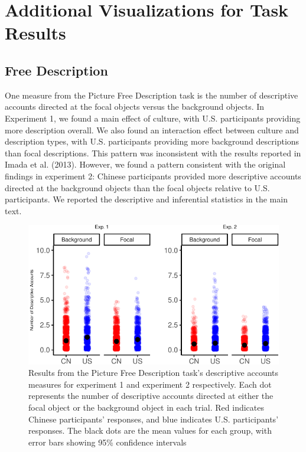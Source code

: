 \documentclass[
  man,floatsintext]{apa6}
\begin{document}
\hypertarget{additional-visualizations-for-task-results}{%
\section{Additional Visualizations for Task Results}\label{additional-visualizations-for-task-results}}

\hypertarget{free-description}{%
\subsection{Free Description}\label{free-description}}

One measure from the Picture Free Description task is the number of descriptive accounts directed at the focal objects versus the background objects. In Experiment 1, we found a main effect of culture, with U.S. participants providing more description overall. We also found an interaction effect between culture and description types, with U.S. participants providing more background descriptions than focal descriptions. This pattern was inconsistent with the results reported in Imada et al. (2013). However, we found a pattern consistent with the original findings in experiment 2: Chinese participants provided more descriptive accounts directed at the background objects than the focal objects relative to U.S. participants. We reported the descriptive and inferential statistics in the main text.

\begin{figure}
\centering
\includegraphics{CCRR_manuscript_files/figure-latex/unnamed-chunk-48-1.pdf}
\caption{\label{fig:unnamed-chunk-48}Results from the Picture Free Description task's descriptive accounts measures for experiment 1 and experiment 2 respectively. Each dot represents the number of descriptive accounts directed at either the focal object or the background object in each trial. Red indicates Chinese participants' responses, and blue indicates U.S. participants' responses. The black dots are the mean values for each group, with error bars showing 95\% confidence intervals}
\end{figure}
\end{document}
